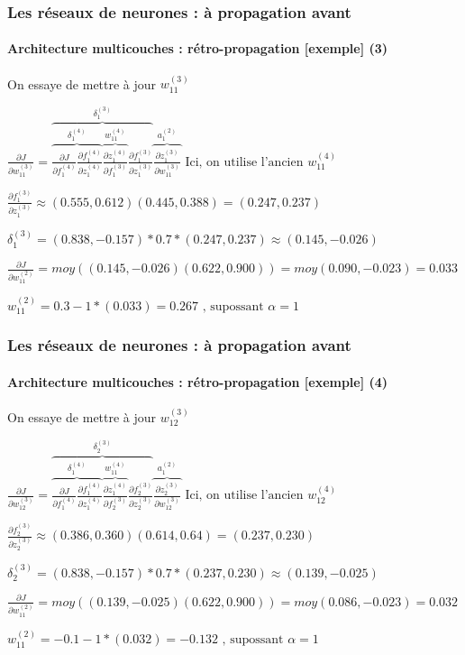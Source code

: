 \documentclass[xcolor=table]{beamer}
\begin{document}
\begin{frame}
\frametitle{Les réseaux de neurones : à propagation avant}
\framesubtitle{Architecture multicouches : rétro-propagation [exemple] (3)}

On essaye de mettre à jour $w_{11}^{(3)}$

$
\frac{\partial J}{\partial w_{11}^{(3)}} = 
\overbrace{
	\overbrace{
		\frac{\partial J}{\partial f_{1}^{(4)}} 
		\frac{\partial f_{1}^{(4)}}{\partial z_{1}^{(4)}}
	}^{\delta_{1}^{(4)}} 
	\overbrace{
		\frac{\partial z_{1}^{(4)}}{\partial f_{1}^{(3)}}
	}^{w_{11}^{(4)}} 
	\frac{\partial f_{1}^{(3)}}{\partial z_{1}^{(3)}} 
}^{\delta_{1}^{(3)}} 
\overbrace{
	\frac{\partial z_{1}^{(3)}}{\partial w_{11}^{(3)}}
}^{a_{1}^{(2)}}
\text{ Ici, on utilise l'ancien } w_{11}^{(4)}
$

$
\frac{\partial f_{1}^{(3)}}{\partial z_{1}^{(3)}} \approx 
(0.555, 0.612) (0.445, 0.388) = (0.247, 0.237)
$

$
\delta_{1}^{(3)} = (0.838, -0.157) * 0.7 * (0.247, 0.237) \approx (0.145, -0.026)
$

$
\frac{\partial J}{\partial w_{11}^{(2)}} = moy((0.145, -0.026) (0.622, 0.900)) 
= moy(0.090, -0.023) = 0.033
$

$
w_{11}^{(2)} = 0.3 - 1 * (0.033) = 0.267 \text{ , supossant } \alpha = 1
$

\end{frame}


\begin{frame}
\frametitle{Les réseaux de neurones : à propagation avant}
\framesubtitle{Architecture multicouches : rétro-propagation [exemple] (4)}

On essaye de mettre à jour $w_{12}^{(3)}$

$
\frac{\partial J}{\partial w_{12}^{(3)}} = 
\overbrace{
	\overbrace{
		\frac{\partial J}{\partial f_{1}^{(4)}} 
		\frac{\partial f_{1}^{(4)}}{\partial z_{1}^{(4)}}
	}^{\delta_{1}^{(4)}} 
	\overbrace{
		\frac{\partial z_{1}^{(4)}}{\partial f_{2}^{(3)}}
	}^{w_{11}^{(4)}} 
	\frac{\partial f_{2}^{(3)}}{\partial z_{2}^{(3)}} 
}^{\delta_{2}^{(3)}} 
\overbrace{
	\frac{\partial z_{2}^{(3)}}{\partial w_{12}^{(3)}}
}^{a_{1}^{(2)}}
\text{ Ici, on utilise l'ancien } w_{12}^{(4)}
$

$
\frac{\partial f_{2}^{(3)}}{\partial z_{2}^{(3)}} \approx 
(0.386, 0.360) (0.614, 0.64) = (0.237, 0.230)
$

$
\delta_{2}^{(3)} = (0.838, -0.157) * 0.7 * (0.237, 0.230) \approx (0.139, -0.025)
$

$
\frac{\partial J}{\partial w_{11}^{(2)}} = moy((0.139, -0.025) (0.622, 0.900)) 
= moy(0.086, -0.023) = 0.032
$

$
w_{11}^{(2)} = - 0.1 - 1 * (0.032) = - 0.132 \text{ , supossant } \alpha = 1
$

\end{frame}
\end{document}
